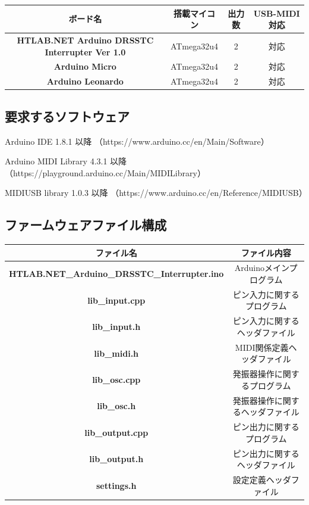 \documentclass[a4paper,11pt]{jsarticle}
\begin{document}
\begin{table}[htbp]
\begin{center}
\begin{tabular}{ | c | c | c | c | }
\hline
\textbf{ボード名} & \textbf{搭載マイコン} & \textbf{出力数} & \textbf{USB-MIDI対応} \\\hline
\textbf{HTLAB.NET Arduino DRSSTC Interrupter Ver 1.0} & ATmega32u4 & 2 & 対応 \\\hline
\textbf{Arduino Micro} & ATmega32u4 & 2 & 対応 \\\hline
\textbf{Arduino Leonardo} & ATmega32u4 & 2 & 対応 \\\hline
\end{tabular}
\end{center}
\end{table}

\subsection{要求するソフトウェア}
Arduino IDE 1.8.1 以降 
（https://www.arduino.cc/en/Main/Software）

Arduino MIDI Library 4.3.1 以降 
（https://playground.arduino.cc/Main/MIDILibrary）

MIDIUSB library 1.0.3 以降 
（https://www.arduino.cc/en/Reference/MIDIUSB）


\subsection{ファームウェアファイル構成}

\begin{table}[htbp]
\begin{center}
\begin{tabular}{ | c | c | }
\hline
\textbf{ファイル名} & \textbf{ファイル内容} \\\hline
\textbf{HTLAB.NET\_Arduino\_DRSSTC\_Interrupter.ino} & Arduinoメインプログラム \\\hline
\textbf{lib\_input.cpp} & ピン入力に関するプログラム \\\hline
\textbf{lib\_input.h} & ピン入力に関するヘッダファイル \\\hline
\textbf{lib\_midi.h} & MIDI関係定義ヘッダファイル \\\hline
\textbf{lib\_osc.cpp} & 発振器操作に関するプログラム \\\hline
\textbf{lib\_osc.h} & 発振器操作に関するヘッダファイル \\\hline
\textbf{lib\_output.cpp} & ピン出力に関するプログラム \\\hline
\textbf{lib\_output.h} & ピン出力に関するヘッダファイル \\\hline
\textbf{settings.h} & 設定定義ヘッダファイル \\\hline
\end{tabular}
\end{center}
\end{table}
\end{document}
